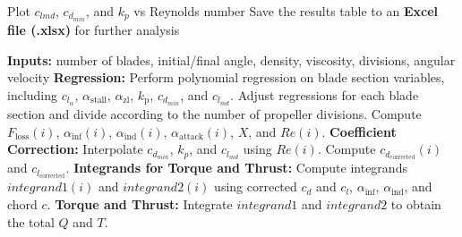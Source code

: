 \documentclass{Format}
\begin{document}
\begin{table}[h!]
\begin{minipage}{0.45\textwidth}
\begin{algorithm}[H]
\begin{algorithmic}[1]
                        \State Plot $c_{lmd}$, $c_{d_{min}}$, and $k_p$ vs Reynolds number
                    \EndFor
                    \State Save the results table to an \textbf{Excel file (.xlsx)} for further analysis
                \end{algorithmic}
            \end{algorithm}
    \end{minipage}
    \hfill
    \begin{minipage}{0.45\textwidth}
            \centering %
            \begin{algorithm}[H]
                \caption{Torque ($Q$) and Thrust ($T$) Calculation using the Traub Model}\label{alg:torque_thrust_calculation}
                \begin{algorithmic}[1]
                    \State \textbf{Inputs:} number of blades, initial/final angle, density, viscosity, divisions, angular velocity
                    \State \textbf{Regression:} Perform polynomial regression on blade section variables, including $c_{l_{\alpha}}$, $\alpha_{\text{stall}}$, $\alpha_{\text{zl}}$, $k_{\text{p}}$, $c_{d_{min}}$, and $c_{l_{md}}$.
                    \State Adjust regressions for each blade section and divide according to the number of propeller divisions.
                        \State Compute $F_{\text{loss}}(i)$, $\alpha_{\text{inf}}(i)$, $\alpha_{\text{ind}}(i)$, $\alpha_{\text{attack}}(i)$, $X$, and $Re(i)$.
                        \State \textbf{Coefficient Correction:}
                        \State Interpolate $c_{d_{min}}$, $k_p$, and $c_{l_{md}}$ using $Re(i)$.
                        \State Compute $c_{d_{\text{corrected}}}(i)$ and $c_{l_{\text{corrected}}}$.
                        \State \textbf{Integrands for Torque and Thrust:}
                        \State Compute integrands $integrand1(i)$ and $integrand2(i)$ using corrected $c_d$ and $c_l$, $\alpha_{\text{inf}}$, $\alpha_{\text{ind}}$, and chord $c$.
                    \EndFor
                    \State \textbf{Torque and Thrust:} Integrate $integrand1$ and $integrand2$ to obtain the total $Q$ and $T$.
                \end{algorithmic} 
            \end{algorithm}
    \end{minipage}
\end{table}
\end{document}
